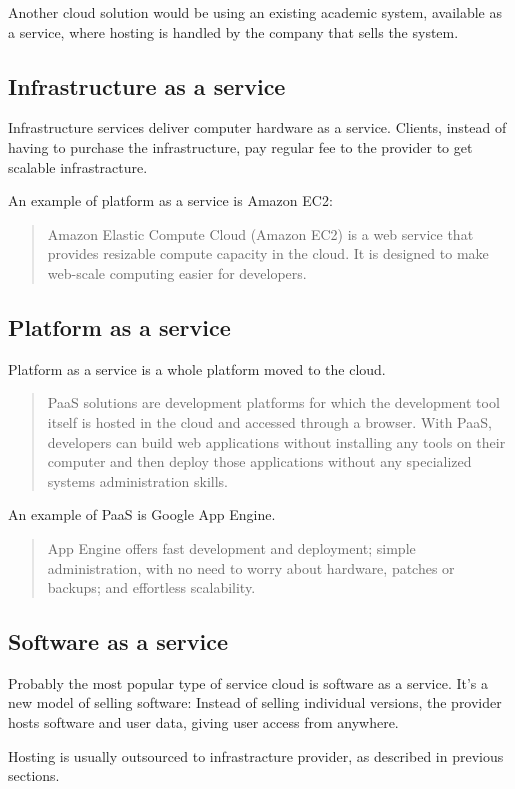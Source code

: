 Another cloud solution would be using an existing academic system, available as a service, where hosting is handled by the company that sells the system. 

\subsection{Infrastructure as a service}

Infrastructure services deliver computer hardware as a service. Clients, instead of having to purchase the infrastructure, pay regular fee to the provider to get scalable infrastracture.

An example of platform as a service is Amazon EC2:

\begin{quotation}
Amazon Elastic Compute Cloud (Amazon EC2) is a web service that provides resizable compute capacity in the cloud. It is designed to make web-scale computing easier for developers. \citep{amazon}
\end{quotation}

\subsection{Platform as a service}

Platform as a service is a whole platform moved to the cloud. 

\begin{quotation}
PaaS solutions are development platforms for which the development tool itself is hosted in the cloud and accessed through a browser. With PaaS, developers can build web applications without installing any tools on their computer and then deploy those applications without any specialized systems administration skills. \citep{paas}
\end{quotation}

An example of PaaS is Google App Engine.

\begin{quotation}
App Engine offers fast development and deployment; simple administration, with no need to worry about hardware, patches or backups; and effortless scalability. \citep{google_appengine}
\end{quotation}

\subsection{Software as a service}

Probably the most popular type of service cloud is software as a service. It’s a new model of selling software: Instead of selling individual versions, the provider hosts software and user data, giving user access from anywhere.

Hosting is usually outsourced to infrastracture provider, as described in previous sections. 